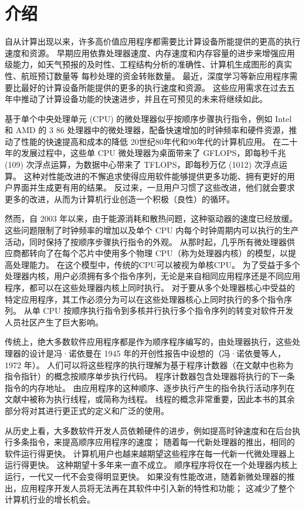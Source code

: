 \section{介绍}

自从计算出现以来，许多高价值应用程序都需要比计算设备所能提供的更高的执行速度和资源。 早期应用依靠处理器速度、内存速度和内存容量的进步来增强应用级能力，如天气预报的及时性、工程结构分析的准确性、计算机生成图形的真实性、航班预订数量等 每秒处理的资金转账数量。 最近，深度学习等新应用程序需要比最好的计算设备所能提供的更多的执行速度和资源。 这些应用需求在过去五年中推动了计算设备功能的快速进步，并且在可预见的未来将继续如此。

基于单个中央处理单元 (CPU) 的微处理器似乎按顺序步骤执行指令，例如 Intel 和 AMD 的 3 86 处理器中的微处理器，配备快速增加的时钟频率和硬件资源，推动了性能的快速提高和成本的降低 20世纪80年代和90年代的计算机应用。 在二十年的发展过程中，这些单 CPU 微处理器为桌面带来了 GFLOPS，即每秒千兆 (109) 次浮点运算，为数据中心带来了 TFLOPS，即每秒万亿 (1012) 次浮点运算。 这种对性能改进的不懈追求使得应用软件能够提供更多功能、拥有更好的用户界面并生成更有用的结果。 反过来，一旦用户习惯了这些改进，他们就会要求更多的改进，从而为计算机行业创造一个积极（良性）的循环。

然而，自 2003 年以来，由于能源消耗和散热问题，这种驱动器的速度已经放缓。 这些问题限制了时钟频率的增加以及单个 CPU 内每个时钟周期内可以执行的生产活动，同时保持了按顺序步骤执行指令的外观。 从那时起，几乎所有微处理器供应商都转向了在每个芯片中使用多个物理 CPU（称为处理器内核）的模型，以提高处理能力。 在这个模型中，传统的CPU可以被视为单核CPU。 为了受益于多个处理器内核，用户必须拥有多个指令序列，无论是来自相同应用程序还是不同应用程序，都可以在这些处理器内核上同时执行。 对于要从多个处理器核心中受益的特定应用程序，其工作必须分为可以在这些处理器核心上同时执行的多个指令序列。 从单 CPU 按顺序执行指令到多核并行执行多个指令序列的转变对软件开发人员社区产生了巨大影响。

传统上，绝大多数软件应用程序都是作为顺序程序编写的，由处理器执行，这些处理器的设计是冯·诺依曼在 1945 年的开创性报告中设想的（冯·诺依曼等人，1972 年）。 人们可以将这些程序的执行理解为基于程序计数器（在文献中也称为指令指针）的概念按顺序单步执行代码。 程序计数器包含处理器将执行的下一条指令的内存地址。 由应用程序的这种顺序、逐步执行产生的指令执行活动序列在文献中被称为执行线程，或简称为线程。 线程的概念非常重要，因此本书的其余部分将对其进行更正式的定义和广泛的使用。

从历史上看，大多数软件开发人员依赖硬件的进步，例如提高时钟速度和在后台执行多条指令，来提高顺序应用程序的速度； 随着每一代新处理器的推出，相同的软件运行得更快。 计算机用户也越来越期望这些程序在每一代新一代微处理器上运行得更快。 这种期望十多年来一直不成立。 顺序程序将仅在一个处理器内核上运行，一代又一代不会变得明显更快。 如果没有性能改进，随着新微处理器的推出，应用程序开发人员将无法再在其软件中引入新的特性和功能； 这减少了整个计算机行业的增长机会。

